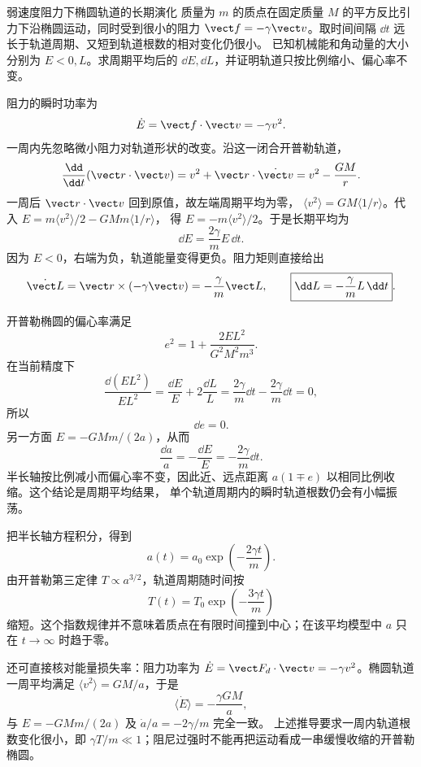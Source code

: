 \begin{origexamplebox}{弱速度阻力下椭圆轨道的长期演化}
\label{ch11:ex:08}
质量为 $m$ 的质点在固定质量 $M$ 的平方反比引力下沿椭圆运动，同时受到很小的阻力
$\vect f=-\gamma\vect v$。取时间间隔 $\dd t$ 远长于轨道周期、又短到轨道根数的相对变化仍很小。
已知机械能和角动量的大小分别为 $E<0,L$。求周期平均后的 $\dd E,\dd L$，并证明轨道只按比例缩小、偏心率不变。
\end{origexamplebox}
\begin{xesolution}
阻力的瞬时功率为
\[
 \dot E=\vect f\cdot\vect v=-\gamma v^2.
\]
一周内先忽略微小阻力对轨道形状的改变。沿这一闭合开普勒轨道，
\[
 \frac{\dd}{\dd t}(\vect r\cdot\vect v)
 =v^2+\vect r\cdot\dot{\vect v}=v^2-\frac{GM}{r}.
\]
一周后 $\vect r\cdot\vect v$ 回到原值，故左端周期平均为零，
$\langle v^2\rangle=GM\langle1/r\rangle$。代入
$E=m\langle v^2\rangle/2-GMm\langle1/r\rangle$，
得 $E=-m\langle v^2\rangle/2$。于是长期平均为
\[
 \boxed{\dd E=\frac{2\gamma}{m}E\,\dd t}.
\]
因为 $E<0$，右端为负，轨道能量变得更负。阻力矩则直接给出
\[
 \dot{\vect L}=\vect r\times(-\gamma\vect v)
 =-\frac\gamma m\vect L,
 \qquad
 \boxed{\dd L=-\frac\gamma mL\,\dd t}.
\]

开普勒椭圆的偏心率满足
\[
 e^2=1+\frac{2EL^2}{G^2M^2m^3}.
\]
在当前精度下
\[
 \frac{\dd(EL^2)}{EL^2}
 =\frac{\dd E}{E}+2\frac{\dd L}{L}
 =\frac{2\gamma}{m}\dd t-\frac{2\gamma}{m}\dd t=0,
\]
所以
\[
 \boxed{\dd e=0}.
\]
另一方面 $E=-GMm/(2a)$，从而
\[
 \frac{\dd a}{a}=-\frac{\dd E}{E}
 =-\frac{2\gamma}{m}\dd t.
\]
半长轴按比例减小而偏心率不变，因此近、远点距离 $a(1\mp e)$ 以相同比例收缩。这个结论是周期平均结果，
单个轨道周期内的瞬时轨道根数仍会有小幅振荡。

把半长轴方程积分，得到
\[
 \boxed{a(t)=a_0\exp\!\left(-\frac{2\gamma t}{m}\right)}.
\]
由开普勒第三定律 $T\propto a^{3/2}$，轨道周期随时间按
\[
 \boxed{T(t)=T_0\exp\!\left(-\frac{3\gamma t}{m}\right)}
\]
缩短。这个指数规律并不意味着质点在有限时间撞到中心；在该平均模型中 $a$ 只在
$t\to\infty$ 时趋于零。

还可直接核对能量损失率：阻力功率为
$\dot E=\vect F_d\cdot\vect v=-\gamma v^2$。椭圆轨道一周平均满足
$\langle v^2\rangle=GM/a$，于是
\[
 \langle\dot E\rangle=-\frac{\gamma GM}{a},
\]
与 $E=-GMm/(2a)$ 及 $\dot a/a=-2\gamma/m$ 完全一致。
上述推导要求一周内轨道根数变化很小，即 $\gamma T/m\ll1$；阻尼过强时不能再把运动看成一串缓慢收缩的开普勒椭圆。
\end{xesolution}
